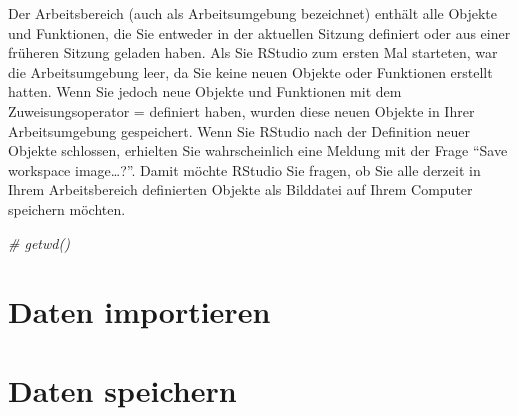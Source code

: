 \documentclass[
]{book}
\newenvironment{Shaded}{\begin{snugshade}}{\end{snugshade}}
\newcommand{\CommentTok}[1]{\textcolor[rgb]{0.56,0.35,0.01}{\textit{#1}}}
\begin{document}
Der Arbeitsbereich (auch als Arbeitsumgebung bezeichnet) enthält alle Objekte und Funktionen, die Sie entweder in der aktuellen Sitzung definiert oder aus einer früheren Sitzung geladen haben. Als Sie RStudio zum ersten Mal starteten, war die Arbeitsumgebung leer, da Sie keine neuen Objekte oder Funktionen erstellt hatten. Wenn Sie jedoch neue Objekte und Funktionen mit dem Zuweisungsoperator = definiert haben, wurden diese neuen Objekte in Ihrer Arbeitsumgebung gespeichert. Wenn Sie RStudio nach der Definition neuer Objekte schlossen, erhielten Sie wahrscheinlich eine Meldung mit der Frage ``Save workspace image\ldots?''. Damit möchte RStudio Sie fragen, ob Sie alle derzeit in Ihrem Arbeitsbereich definierten Objekte als Bilddatei auf Ihrem Computer speichern möchten.

\begin{Shaded}
\begin{Highlighting}[]
\CommentTok{\# getwd()}
\end{Highlighting}
\end{Shaded}

\hypertarget{daten-importieren}{%
\section{Daten importieren}\label{daten-importieren}}

\hypertarget{daten-speichern}{%
\section{Daten speichern}\label{daten-speichern}}

  
\end{document}

